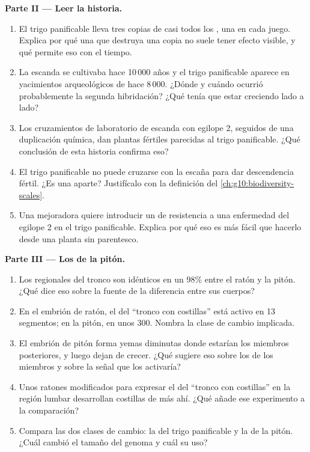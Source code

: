 \begin{problem}
\medskip
\noindent\textbf{Parte II --- Leer la historia.}
\begin{enumerate}[resume]
  \item El trigo panificable lleva tres copias de casi todos los ,
        una en cada juego. Explica por qué una  que destruya
        una copia no suele tener efecto visible, y qué permite eso con
        el tiempo.
  \item La escanda se cultivaba hace 10\,000 años y el trigo
        panificable aparece en yacimientos arqueológicos de hace
        8\,000. ¿Dónde y cuándo ocurrió probablemente la segunda
        hibridación? ¿Qué tenía que estar creciendo lado a lado?
  \item Los cruzamientos de laboratorio de escanda con egilope 2,
        seguidos de una duplicación química, dan plantas fértiles
        parecidas al trigo panificable. ¿Qué conclusión de esta
        historia confirma eso?
  \item El trigo panificable no puede cruzarse con la escaña para dar
        descendencia fértil. ¿Es una  aparte? Justifícalo con
        la definición del \cref{ch:g10:biodiversity-scales}.
  \item Una mejoradora quiere introducir un  de resistencia a una
        enfermedad del egilope 2 en el trigo panificable. Explica por
        qué eso es más fácil que hacerlo desde una planta sin
        parentesco.
\end{enumerate}

\medskip
\noindent\textbf{Parte III --- Los  de la pitón.}
\begin{enumerate}[resume]
  \item Los  regionales del tronco son idénticos en un 98\% entre
        el ratón y la pitón. ¿Qué dice eso sobre la fuente de la
        diferencia entre sus cuerpos?
  \item En el embrión de ratón, el  del ``tronco con costillas''
        está activo en 13 segmentos; en la pitón, en unos 300. Nombra
        la clase de cambio implicada.
  \item El embrión de pitón forma yemas diminutas donde estarían los
        miembros posteriores, y luego dejan de crecer. ¿Qué sugiere eso
        sobre los  de los miembros y sobre la señal que los
        activaría?
  \item Unos ratones modificados para expresar el  del ``tronco con
        costillas'' en la región lumbar desarrollan costillas de más
        ahí. ¿Qué añade ese experimento a la comparación?
  \item Compara las dos clases de cambio: la del trigo panificable y la
        de la pitón. ¿Cuál cambió el tamaño del genoma y cuál su uso?
\end{enumerate}


\end{problem}
